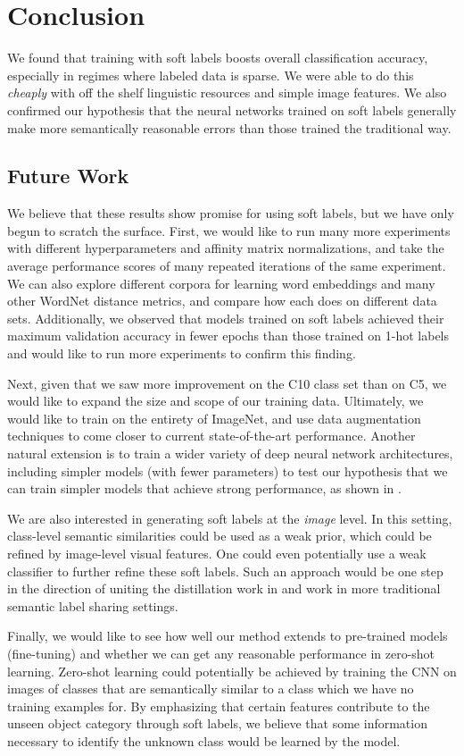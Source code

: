 \section{Conclusion}

We found that training with soft labels boosts overall classification accuracy,
especially in regimes where labeled data is sparse. We were able to do this
\emph{cheaply} with off the shelf linguistic resources and simple image
features. We also confirmed our hypothesis that the neural networks trained on
soft labels generally make more semantically reasonable errors than those trained
the traditional way.


\subsection{Future Work}

We believe that these results show promise for using soft labels, but we have
only begun to scratch the surface. First, we would like to run many more
experiments with different hyperparameters and affinity matrix normalizations,
and take the average performance scores of many repeated iterations of the same
experiment. We can also explore different corpora for learning word embeddings
and many other WordNet distance metrics, and compare how each does on different
data sets. Additionally, we observed that models trained on soft labels achieved
their maximum validation accuracy in fewer epochs than those trained on 1-hot
labels and would like to run more experiments to confirm this finding.  

Next, given that we saw more improvement on the C10 class set than on C5, we
would like to expand the size and scope of our training data. Ultimately, we
would like to train on the entirety of ImageNet, and use data augmentation
techniques to come closer to current state-of-the-art performance. Another
natural extension is to train a wider variety of deep neural network
architectures, including simpler models (with fewer parameters) to test our
hypothesis that we can train simpler models that achieve strong performance, as
shown in \cite{hinton2015distilling}.

We are also interested in generating soft labels at the \emph{image} level. In
this setting, class-level semantic similarities could be used as a weak prior,
which could be refined by image-level visual features. One could even
potentially use a weak classifier to further refine these soft labels. Such an
approach would be one step in the direction of uniting the distillation work in
\cite{hinton2015distilling} and work in more traditional semantic label sharing
settings.

Finally, we would like to see how well our method extends to pre-trained models
(fine-tuning) and whether we can get any reasonable performance in zero-shot
learning. Zero-shot learning could potentially be achieved by training the CNN
on images of classes that are semantically similar to a class which we have no
training examples for. By emphasizing that certain features contribute to the
unseen object category through soft labels, we believe that some information
necessary to identify the unknown class would be learned by the model.

